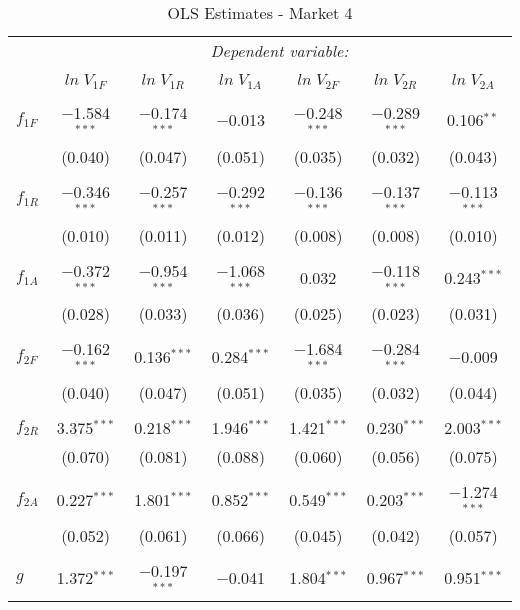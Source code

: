 \begin{table}[!htbp] \centering 
  \caption{OLS Estimates - Market 4} 
  \label{} 
\begin{tabular}{@{\extracolsep{5pt}}lcccccc} 
\toprule 
 & \multicolumn{6}{c}{\textit{Dependent variable:}} \\ 
\cline{2-7} 
\\[-1.8ex] & $ln \; V_{1F}$ & $ln \; V_{1R}$ & $ln \; V_{1A}$ & $ln \; V_{2F}$ & $ln \; V_{2R}$ & $ln \; V_{2A}$ \\ 
\hline \\[-1.8ex] 
  $f_{1F}$ & $-$1.584$^{***}$ & $-$0.174$^{***}$ & $-$0.013 & $-$0.248$^{***}$ & $-$0.289$^{***}$ & 0.106$^{**}$ \\ 
  & (0.040) & (0.047) & (0.051) & (0.035) & (0.032) & (0.043) \\ 
  & & & & & & \\ 
 $f_{1R}$ & $-$0.346$^{***}$ & $-$0.257$^{***}$ & $-$0.292$^{***}$ & $-$0.136$^{***}$ & $-$0.137$^{***}$ & $-$0.113$^{***}$ \\ 
  & (0.010) & (0.011) & (0.012) & (0.008) & (0.008) & (0.010) \\ 
  & & & & & & \\ 
 $f_{1A}$ & $-$0.372$^{***}$ & $-$0.954$^{***}$ & $-$1.068$^{***}$ & 0.032 & $-$0.118$^{***}$ & 0.243$^{***}$ \\ 
  & (0.028) & (0.033) & (0.036) & (0.025) & (0.023) & (0.031) \\ 
  & & & & & & \\ 
 $f_{2F}$ & $-$0.162$^{***}$ & 0.136$^{***}$ & 0.284$^{***}$ & $-$1.684$^{***}$ & $-$0.284$^{***}$ & $-$0.009 \\ 
  & (0.040) & (0.047) & (0.051) & (0.035) & (0.032) & (0.044) \\ 
  & & & & & & \\ 
 $f_{2R}$ & 3.375$^{***}$ & 0.218$^{***}$ & 1.946$^{***}$ & 1.421$^{***}$ & 0.230$^{***}$ & 2.003$^{***}$ \\ 
  & (0.070) & (0.081) & (0.088) & (0.060) & (0.056) & (0.075) \\ 
  & & & & & & \\ 
 $f_{2A}$ & 0.227$^{***}$ & 1.801$^{***}$ & 0.852$^{***}$ & 0.549$^{***}$ & 0.203$^{***}$ & $-$1.274$^{***}$ \\ 
  & (0.052) & (0.061) & (0.066) & (0.045) & (0.042) & (0.057) \\ 
  & & & & & & \\ 
 $g$ & 1.372$^{***}$ & $-$0.197$^{***}$ & $-$0.041 & 1.804$^{***}$ & 0.967$^{***}$ & 0.951$^{***}$ \\ 

\end{tabular}
\end{table}
